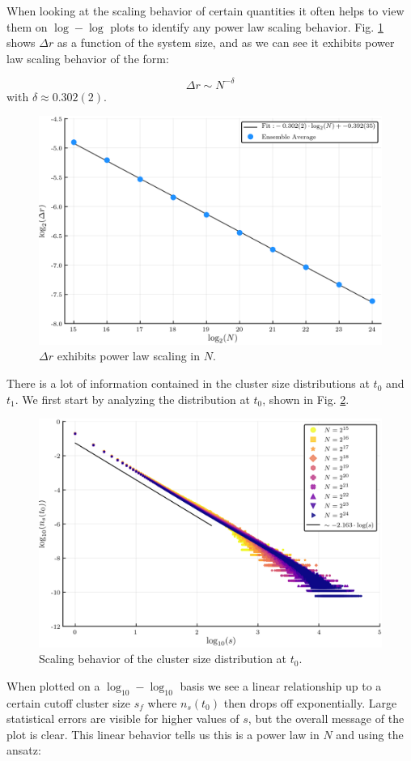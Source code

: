 When looking at the scaling behavior of certain quantities it often helps to view them on $\log-\log$ plots to identify any power law scaling behavior.
Fig. \ref{fig:delta_r_scaling} shows $\Delta r$ as a function of the system size, and as we can see it exhibits power law scaling behavior of the form:

\begin{equation}
	\Delta r \sim N^{-\delta}
\end{equation}
with $\delta \approx 0.302(2)$.

\begin{figure}[H]
	\centering
	\includegraphics[width=350pt, clip]{images/delta_r_scaling.png}
	\caption{$\Delta r$ exhibits power law scaling in $N$.}
	\label{fig:delta_r_scaling}
\end{figure}

There is a lot of information contained in the cluster size distributions at $t_0$ and $t_1$.
We first start by analyzing the distribution at $t_0$, shown in Fig. \ref{fig:n_s_t_0}.

\begin{figure}[H]
	\centering
	\includegraphics[width=350pt, clip]{images/n_s_t_0.png}
	\caption{Scaling behavior of the cluster size distribution at $t_0$.}
	\label{fig:n_s_t_0}
\end{figure}
When plotted on a $\log_{10}-\log_{10}$ basis we see a linear relationship up to a certain cutoff cluster size $s_f$ where $n_s(t_0)$ then drops off exponentially.
Large statistical errors are visible for higher values of $s$, but the overall message of the plot is clear.
This linear behavior tells us this is a power law in $N$ and using the ansatz:

